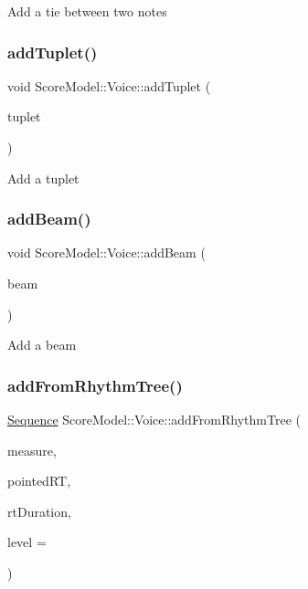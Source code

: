 Add a tie between two notes \mbox{\label{classScoreModel_1_1Voice_ad9d6bdd1aab4ed07e52bb5c09924662b}} 
\subsubsection{\texorpdfstring{addTuplet()}{addTuplet()}}
{\footnotesize\ttfamily void Score\+Model\+::\+Voice\+::add\+Tuplet (\begin{DoxyParamCaption}\item[{\mbox{\hyperlink{classScoreModel_1_1Tuplet}{Tuplet}} $\ast$}]{tuplet }\end{DoxyParamCaption})}

Add a tuplet \mbox{\label{classScoreModel_1_1Voice_a5e995ab144d0bef4bb7d5c8876662c86}} 
\subsubsection{\texorpdfstring{addBeam()}{addBeam()}}
{\footnotesize\ttfamily void Score\+Model\+::\+Voice\+::add\+Beam (\begin{DoxyParamCaption}\item[{\mbox{\hyperlink{classScoreModel_1_1Beam}{Beam}} $\ast$}]{beam }\end{DoxyParamCaption})}

Add a beam \mbox{\label{classScoreModel_1_1Voice_a30cf5805201179908dee043b23de3d84}} 
\subsubsection{\texorpdfstring{addFromRhythmTree()}{addFromRhythmTree()}}
{\footnotesize\ttfamily \mbox{\hyperlink{classScoreModel_1_1Sequence}{Sequence}} Score\+Model\+::\+Voice\+::add\+From\+Rhythm\+Tree (\begin{DoxyParamCaption}\item[{\mbox{\hyperlink{classScoreModel_1_1Measure}{Measure}} $\ast$}]{measure,  }\item[{const \mbox{\hyperlink{classPointedRhythmTree}{Pointed\+Rhythm\+Tree}} $\ast$}]{pointed\+RT,  }\item[{\mbox{\hyperlink{classScoreModel_1_1Duration}{Duration}}}]{rt\+Duration,  }\item[{int}]{level = {} }\end{DoxyParamCaption})}

